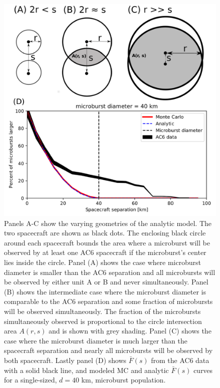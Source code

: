 \documentclass[draft]{agujournal2019}
\begin{document}
\begin{figure}
\includegraphics[width=\textwidth]{fig5.pdf}
\caption{Panels A-C show the varying geometries of the analytic model. The two spacecraft are shown as black dots. The enclosing black circle around each spacecraft bounds the area where a microburst will be observed by at least one AC6 spacecraft if the microburst's center lies inside the circle. Panel (A) shows the case where microburst diameter is smaller than the AC6 separation and all microbursts will be observed by either unit A or B and never simultaneously. Panel (B) shows the intermediate case where the microburst diameter is comparable to the AC6 separation and some fraction of microbursts will be observed simultaneously. The fraction of the microbursts simultaneously observed is proportional to the circle intersection area $A(r, s)$ and is shown with grey shading. Panel (C) shows the case where the microburst diameter is much larger than the spacecraft separation and nearly all microbursts will be observed by both spacecraft. Lastly panel (D) shows $\bar{F}(s)$ from the AC6 data with a solid black line, and modeled MC and analytic $\bar{F}(s)$ curves for a single-sized, $d = 40$ km,  microburst population.} 
\label{fig5}
\end{figure}
\end{document}
